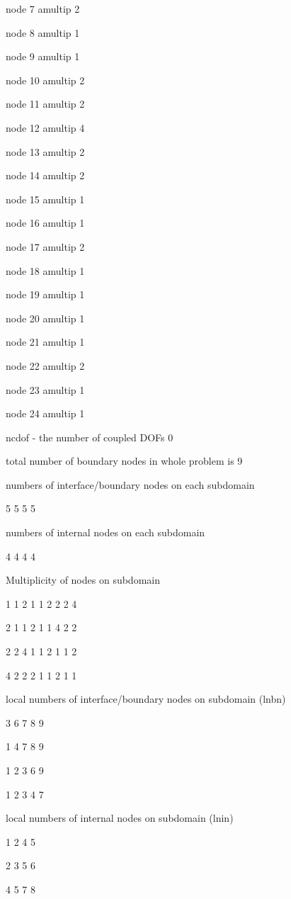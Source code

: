  node      7  amultip   2

 node      8  amultip   1

 node      9  amultip   1

 node     10  amultip   2

 node     11  amultip   2

 node     12  amultip   4

 node     13  amultip   2

 node     14  amultip   2

 node     15  amultip   1

 node     16  amultip   1

 node     17  amultip   2

 node     18  amultip   1

 node     19  amultip   1

 node     20  amultip   1

 node     21  amultip   1

 node     22  amultip   2

 node     23  amultip   1

 node     24  amultip   1


 ncdof - the number of coupled DOFs 0


 total number of boundary nodes in whole problem is 9



 numbers of interface/boundary nodes on each subdomain 


 5 5 5 5


 numbers of internal nodes on each subdomain 

 4 4 4 4


 Multiplicity of nodes on subdomain

 1 1 2 1 1 2 2 2 4

 2 1 1 2 1 1 4 2 2

 2 2 4 1 1 2 1 1 2

 4 2 2 2 1 1 2 1 1



 local numbers of interface/boundary nodes on subdomain (lnbn)

 3 6 7 8 9

 1 4 7 8 9

 1 2 3 6 9

 1 2 3 4 7


 local numbers of internal nodes on subdomain (lnin)

 1 2 4 5

 2 3 5 6

 4 5 7 8

